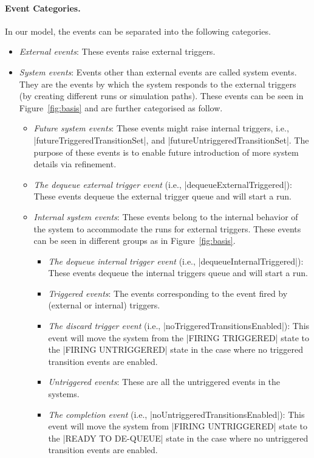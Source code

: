\paragraph{Event Categories.} In our \EventB model, the events can
be separated into the following categories.
\begin{itemize}
\item \emph{External events}: These events raise external triggers.
  
\item \emph{System events}: Events other than external events are
  called system events. They are the events by which the system
  responds to the external triggers (by creating 
  different runs or simulation paths).
  These events can be seen in Figure~\ref{fig:basis} and are further
  categorised as follow.
  \begin{itemize}
  \item \emph{Future system events}: These events might raise internal
    triggers, i.e., |futureTriggeredTransitionSet|, and
    |futureUntriggeredTransitionSet|.  The purpose of these events is
    to enable future introduction of more system details via
    refinement.
    
  \item \emph{The dequeue external trigger event} (i.e.,
    |dequeueExternalTriggered|): These events dequeue the
    external trigger queue and will start a run.

  \item \emph{Internal system events}: These events belong to the
    internal behavior of the system to accommodate the runs for external
    triggers.  These events can be seen in different groups as in
    Figure~\ref{fig:basis}.
    \begin{itemize}
    \item \emph{The dequeue internal trigger event} (i.e.,
      |dequeueInternalTriggered|): These events dequeue the
      internal triggers queue and will start a run.
    
    \item \emph{Triggered events}: The events corresponding to the
     event fired by (external or internal) triggers.

    \item \emph{The discard trigger event} (i.e.,
      |noTriggeredTransitionsEnabled|):  This event will move the system
      from the |FIRING TRIGGERED| state to the |FIRING UNTRIGGERED| state 
      in the case where no triggered transition events are enabled.
    
    \item \emph{Untriggered events}:  These are all the untriggered 
    events in the systems.

    \item \emph{The completion event} (i.e.,
      |noUntriggeredTransitionsEnabled|): This event will move the
      system from |FIRING UNTRIGGERED| state to the |READY TO DE-QUEUE|
      state in the case where no untriggered transition events are
      enabled.
    \end{itemize}
  \end{itemize}
\end{itemize}

